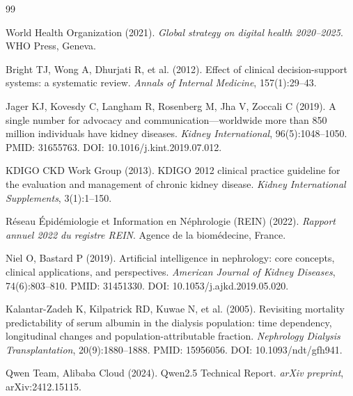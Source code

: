 \documentclass[12pt,a4paper,twoside]{report}
\begin{document}

\begin{thebibliography}{99}
\fancyhead[RE,RO]{}

World Health Organization (2021).
\newblock \textit{Global strategy on digital health 2020--2025}.
\newblock WHO Press, Geneva.

Bright TJ, Wong A, Dhurjati R, et al. (2012).
\newblock Effect of clinical decision-support systems: a systematic review.
\newblock \textit{Annals of Internal Medicine}, 157(1):29--43.

Jager KJ, Kovesdy C, Langham R, Rosenberg M, Jha V, Zoccali C (2019).
\newblock A single number for advocacy and communication---worldwide more than 850 million individuals have kidney diseases.
\newblock \textit{Kidney International}, 96(5):1048--1050.
\newblock PMID: 31655763. DOI: 10.1016/j.kint.2019.07.012.

KDIGO CKD Work Group (2013).
\newblock KDIGO 2012 clinical practice guideline for the evaluation and management of chronic kidney disease.
\newblock \textit{Kidney International Supplements}, 3(1):1--150.

Réseau Épidémiologie et Information en Néphrologie (REIN) (2022).
\newblock \textit{Rapport annuel 2022 du registre REIN}.
\newblock Agence de la biomédecine, France.

Niel O, Bastard P (2019).
\newblock Artificial intelligence in nephrology: core concepts, clinical applications, and perspectives.
\newblock \textit{American Journal of Kidney Diseases}, 74(6):803--810.
\newblock PMID: 31451330. DOI: 10.1053/j.ajkd.2019.05.020.

Kalantar-Zadeh K, Kilpatrick RD, Kuwae N, et al. (2005).
\newblock Revisiting mortality predictability of serum albumin in the dialysis population: time dependency, longitudinal changes and population-attributable fraction.
\newblock \textit{Nephrology Dialysis Transplantation}, 20(9):1880--1888.
\newblock PMID: 15956056. DOI: 10.1093/ndt/gfh941.

Qwen Team, Alibaba Cloud (2024).
\newblock Qwen2.5 Technical Report.
\newblock \textit{arXiv preprint}, arXiv:2412.15115.


\end{thebibliography}
\end{document}
